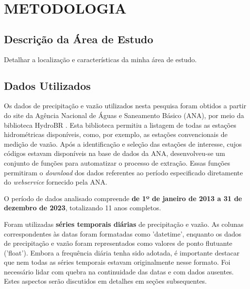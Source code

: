 \chapter{METODOLOGIA}
\section{Descrição da Área de Estudo}
Detalhar a localização e características da minha área de estudo.

\section{Dados Utilizados}

Os dados de precipitação e vazão utilizados nesta pesquisa foram obtidos a partir do site da Agência Nacional de Águas e Saneamento Básico (ANA), por meio da biblioteca HydroBR \cite{carvalho2020hydrobr}. Esta biblioteca permitiu a listagem de todas as estações hidrométricas disponíveis, como, por exemplo, as estações convencionais de medição de vazão. Após a identificação e seleção das estações de interesse, cujos códigos estavam disponíveis na base de dados da ANA, desenvolveu-se um conjunto de funções para automatizar o processo de extração. Essas funções permitiram o \textit{download} dos dados referentes ao período especificado diretamente do \textit{webservice} fornecido pela ANA.

O período de dados analisado compreende \textbf{de 1º de janeiro de 2013 a 31 de dezembro de 2023}, totalizando 11 anos completos.

Foram utilizadas \textbf{séries temporais diárias} de precipitação e vazão. As colunas correspondentes às datas foram formatadas como 'datetime', enquanto os dados de precipitação e vazão foram representados como valores de ponto flutuante ('float'). Embora a frequência diária tenha sido adotada, é importante destacar que nem todas as séries temporais estavam originalmente nesse formato. Foi necessário lidar com quebra na continuidade das datas e com dados ausentes. Estes aspectos serão discutidos em detalhes em seções subsequentes.

